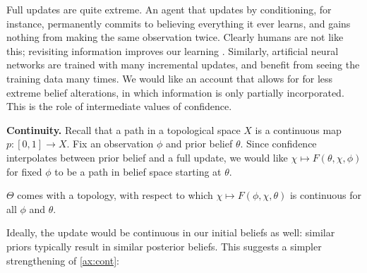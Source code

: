 Full updates are quite extreme.
An agent that updates by conditioning, for instance,
permanently commits to believing everything it ever learns,
and gains nothing from making the same observation twice.
Clearly humans are not like this; revisiting information
 	improves our learning \parencite{ausubel1965effect}.
Similarly, artificial neural networks are trained with
 	many incremental updates, and benefit from seeing 
	the training data many times.
We would like an account that allows for for less extreme belief alterations,
in which information is only partially incorporated.
This is the role of intermediate values of confidence.

\textbf{Continuity.}
Recall that a path in a topological space $X$ is a continuous map $p : [0,1] \to X$. 
Fix an observation $\phi$ and prior belief $\theta$. 
Since confidence interpolates 
between prior belief and a full update,
we would like 
$\chi \mapsto F(\theta,\chi,\phi)$
for fixed $\phi$ to be a path
in belief space starting at $\theta$.

\begin{CFaxioms}[nosep]
	\item
	$\Theta$ comes with a topology, with respect to which
	$
	\chi \mapsto F(\phi,\chi,\theta)
	$
	is continuous
	for all $\phi$ and $\theta$.
	\label{ax:cont}
\end{CFaxioms}



Ideally, the update would be continuous in our initial
beliefs as well: similar priors typically result
in similar posterior beliefs.
This suggests a simpler strengthening of \cref{ax:cont}:

